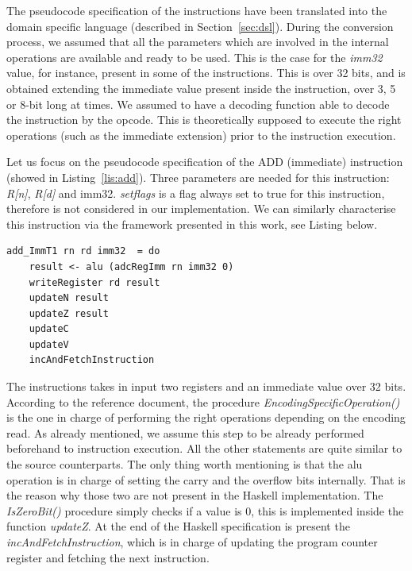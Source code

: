 \documentclass[conference]{IEEEtran}
\begin{document}
The pseudocode specification of the instructions have been translated into the domain
specific language (described in Section~\ref{sec:dsl}). During the conversion process, we
assumed that all the parameters which are involved in the internal operations are available
and ready to be used. This is the case for the \textit{imm32} value, for instance, present in
some of the instructions. This is over 32 bits, and is obtained extending the immediate value
present inside the instruction, over 3, 5 or 8-bit long at times. We assumed to have a
decoding function able to decode the instruction by the opcode. This is theoretically
supposed to execute the right operations (such as the immediate extension) prior to the
instruction execution.

Let us focus on the pseudocode specification of the ADD (immediate) instruction (showed in
Listing~\ref{lis:add}). Three parameters are needed for this instruction: \textit{R[n]},
\textit{R[d]} and imm32. \textit{setflags} is a flag always set to true for this instruction,
therefore is not considered in our implementation. We can similarly characterise this instruction
via the framework presented in this work, see Listing below.\\

\begin{lstlisting}[caption=ADD (immediate) instruction - Haskell-based specification,
frame=single, label=lis:addH]
add_ImmT1 rn rd imm32  = do
    result <- alu (adcRegImm rn imm32 0)
    writeRegister rd result
    updateN result
    updateZ result
    updateC
    updateV
    incAndFetchInstruction
\end{lstlisting}

\noindent
The instructions takes in input two registers and an immediate value over 32 bits. According
to the reference document, the procedure \textit{EncodingSpecificOperation()} is the one in
charge of performing the right operations depending on the encoding read. As already
mentioned, we assume this step to be already performed beforehand to instruction execution.
All the other statements are quite similar to the source counterparts.
The only thing worth mentioning is that the alu operation is in charge of
setting the carry and the overflow bits internally. That is the reason why those two are not
present in the Haskell implementation. The \textit{IsZeroBit()} procedure simply checks if a
value is 0, this is implemented inside the function \textit{updateZ}. At the end of the
Haskell specification is present the \textit{incAndFetchInstruction}, which is in charge of
updating the program counter register and fetching the next instruction.
\end{document}
